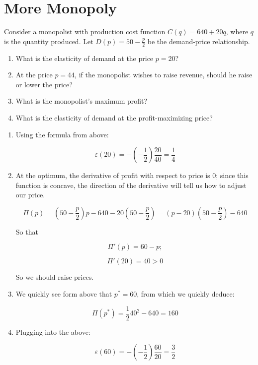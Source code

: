 \documentclass{article}
\newenvironment{solution}{\color{red}}{\color{black}}
\begin{document}
\section*{More Monopoly}
Consider a monopolist with production cost function $C(q) = 640 + 20q$, where $q$ is the quantity produced. Let $D(p) = 50 - \frac{p}2$ be the demand-price relationship.

\begin{enumerate}
\item What is the elasticity of demand at the price $p = 20$?
\item At the price $p = 44$, if the monopolist wishes to raise revenue, should he raise or lower the price?
\item What is the monopolist's maximum profit?
\item What is the elasticity of demand at the profit-maximizing price?
\end{enumerate}

\begin{solution}

\begin{enumerate}
\item Using the formula from above:

\[ \varepsilon(20) = - \left( -\frac12 \right) \frac{20}{40} = \frac14 \]

\item At the optimum, the derivative of profit with respect to price is 0; since this function is concave, the direction of the derivative will tell us how to adjust our price.

\[ \Pi(p) = (50 - \frac{p}2) p - 640 - 20(50 - \frac{p}2) = (p - 20)(50 - \frac{p}2) - 640 \]

So that

\[ \Pi'(p) = 60 - p; \]

\[ \Pi'(20) = 40 > 0 \]

So we should raise prices.

\item We quickly see form above that $p^{*} = 60$, from which we quickly deduce:

\[ \Pi(p^{*}) = \frac12 40^2 - 640 = 160 \]

\item Plugging into the above:

\[ \varepsilon(60) = - \left( -\frac12 \right) \frac{60}{20} = \frac32 \]
\end{enumerate}

\end{solution}
\end{document}
